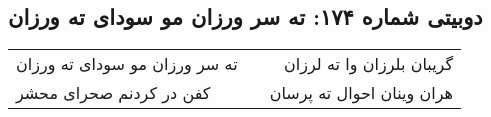 \begin{center}
\section*{دوبیتی شماره ۱۷۴: ته سر ورزان مو سودای ته ورزان}
\label{sec:174}
\begin{longtable}{l p{0.5cm} r}
ته سر ورزان مو سودای ته ورزان
&&
گریبان بلرزان وا ته لرزان
\\
کفن در کردنم صحرای محشر
&&
هران وینان احوال ته پرسان
\\
\end{longtable}
\end{center}
